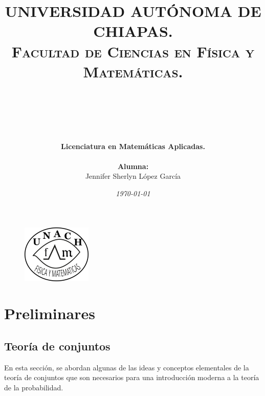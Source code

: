 \documentclass[12pt]{article}
\begin{document}
\title{\Huge{\textbf{\textsc{\textcolor{tcp}{UNIVERSIDAD AUT\'ONOMA DE CHIAPAS.}}}}\\
\huge{\textbf{\textsc{\textcolor{tcp}{Facultad de Ciencias en F\'isica y Matem\'aticas.}}}} \\ \vspace{1cm}{\Huge{\textbf{\textcolor{tcp}{Avances de tesis}}} }\\}
\captionsetup[table]{labelformat=empty}
\captionsetup[figure]{labelformat=empty}
\begin{figure}[t]
    \centering
    \includegraphics[scale=.15]{FCFMLOGO.png}
    \caption{}
    \label{fig:my_label}
\end{figure}
\author{\Large{\textbf{\textcolor{tcp}{ }}}\\ \hspace{.2cm}      \vspace{.4cm}\\ \vspace{.3cm}\\\Large{\textbf{\textcolor{tcp}{Licenciatura en Matemáticas Aplicadas.}}}\vspace{.5cm}\\\\\Large{\textbf{\textcolor{tcp}{Alumna:}}}\hspace{0.5cm}\\Jennifer Sherlyn López García}
\date{\vspace{4 cm} \textit{\today}}

\newpage

\maketitle
\tableofcontents

\newpage
\section{Preliminares}
\subsection{Teoría de conjuntos}
En esta sección, se abordan algunas de las ideas y conceptos elementales de la teoría de conjuntos que son necesarios para una introducción moderna a la teoría de la probabilidad.\\
\end{document}

